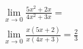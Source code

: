 \begin{ex}
\begin{align}
&\lim_{x\rightarrow 0} \frac{5x^2+2x}{4x^2+3x}=\nonumber\\
&\lim_{x\rightarrow 0} \frac{x(5x+2)}{x(4x+3)}=\frac{2}{3}\nonumber
\end{align}
\end{ex}